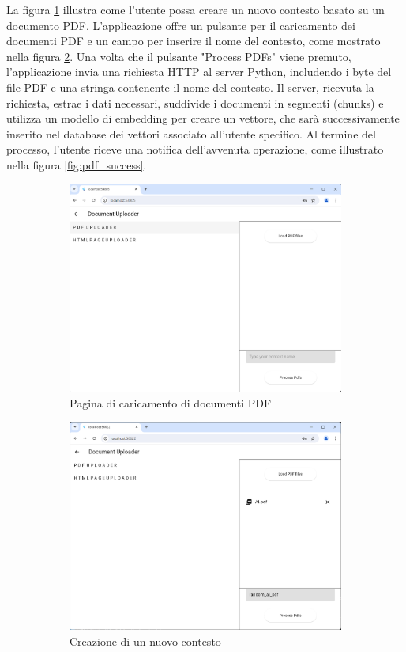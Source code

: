 La figura \ref{fig:pdfs_page} illustra come l'utente possa creare un nuovo contesto basato su un documento PDF. L'applicazione offre un pulsante per il caricamento dei documenti PDF e un campo per inserire il nome del contesto, come mostrato nella figura \ref{fig:context-making}. Una volta che il pulsante "Process PDFs" viene premuto, l'applicazione invia una richiesta HTTP al server Python, includendo i byte del file PDF e una stringa contenente il nome del contesto.
Il server, ricevuta la richiesta, estrae i dati necessari, suddivide i documenti in segmenti (chunks) e utilizza un modello di embedding per creare un vettore, che sarà successivamente inserito nel database dei vettori associato all'utente specifico. Al termine del processo, l'utente riceve una notifica dell'avvenuta operazione, come illustrato nella figura \ref{fig:pdf_success}.
\begin{figure}[H]
	\centering
	\begin{subfigure}{.5\textwidth}
		\centering
		\includegraphics[width=0.45\linewidth]{Immagini/pdf_uploader_page.png}
		\caption{Pagina di caricamento di documenti PDF\newline}
		\label{fig:pdfs_page}
	\end{subfigure}%
	\begin{subfigure}{.5\textwidth}
		\centering
		\includegraphics[width=0.45\linewidth]{Immagini/pdf_upload.png}
		\caption{Creazione di un nuovo contesto\newline}
		\label{fig:context-making}
	\end{subfigure}
	\begin{subfigure}{.5\textwidth}

\end{subfigure}
\end{figure}
